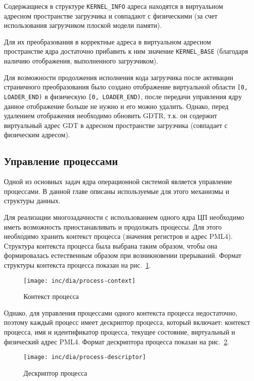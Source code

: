 Содержащиеся в структуре \texttt{KERNEL\_INFO} адреса находятся в виртуальном адресном
пространстве загрузчика и совпадают с физическими (за счет использования загрузчиком плоской
модели памяти).

Для их преобразования в корректные адреса в виртуальном адресном пространстве ядра
достаточно прибавить к ним значение \texttt{KERNEL\_BASE} (благодаря наличию отображения,
выполненного загрузчиком).

Для возможности продолжения исполнения кода загрузчика после активации страничного преобразования
было создано отображение виртуальной области \texttt{[0, LOADER\_END)} в физическую \texttt{[0, LOADER\_END)},
после передачи управления ядру данное отображение больше не нужно и его можно удалить. Однако, перед
удалением отображения необходимо обновить GDTR, т.к. он содержит виртуальный адрес GDT в адресном
пространстве загрузчика (совпадает с физическим адресом).

\subsection{Управление процессами}
Одной из основных задач ядра операционной системой является управление процессами. В данной
главе описаны используемые для этого механизмы и структуры данных.

Для реализации многозадачности с использованием одного ядра ЦП необходимо иметь возможность
приостанавливать и продолжать процессы. Для этого необходимо хранить контекст процесса
(значения регистров и адрес PML4). Структура контекста процесса была выбрана таким образом,
чтобы она формировалась естественным образом при возникновении прерываний. Формат структуры
контекста процесса показан на рис.~\ref{fig:process-context}.

\begin{figure}[ht!]
  \centering
  \texttt{[image: inc/dia/process-context]}
  \caption{Контекст процесса}
  \label{fig:process-context}
\end{figure}

Однако, для управления процессами одного контекста процесса недостаточно, поэтому каждый
процесс имеет дескриптор процесса, который включает: контекст процесса, имя и идентификатор процесса,
текущее состояние, виртуальный и физический адрес PML4. Формат дескриптора процесса показан
на рис.~\ref{fig:process-descriptor}.

\begin{figure}[ht!]
  \centering
  \texttt{[image: inc/dia/process-descriptor]}
  \caption{Дескриптор процесса}
  \label{fig:process-descriptor}
\end{figure}

